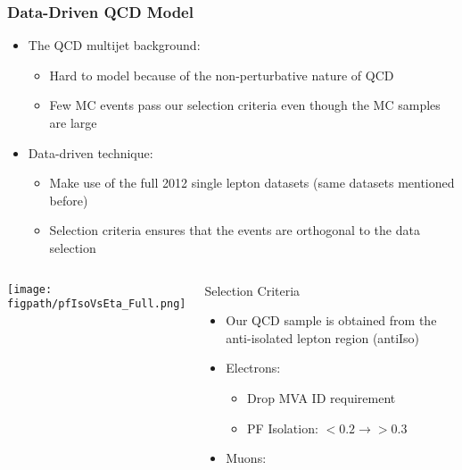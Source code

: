 \begin{frame}
	\frametitle{Data-Driven QCD Model}
	\vspace*{-0.24cm}
	\begin{block}{}
		\begin{itemize}
			\small
			\item The QCD multijet background:
			\begin{itemize}
				\footnotesize
				\item Hard to model because of the non-perturbative nature of QCD
				\item Few MC events pass our selection criteria even though the MC samples are large
			\end{itemize}
			\item Data-driven technique:
			\begin{itemize}
				\footnotesize
				\item Make use of the full 2012 single lepton datasets (same datasets mentioned before)
				\item Selection criteria ensures that the events are orthogonal to the data selection
			\end{itemize}
		\end{itemize}
	\end{block}
	\vspace*{-0.49cm}
	\begin{columns}[T]
			\vspace*{-0.1cm}
			\begin{center}
				\texttt{[image: \\figpath/pfIsoVsEta\_Full.png]}
			\end{center}
			\begin{block}{Selection Criteria}
				\begin{itemize}
					\scriptsize
					\item Our QCD sample is obtained from the anti-isolated lepton region (antiIso)
					\vspace*{-0.15cm}
					\item Electrons:
					\begin{itemize}
						\scriptsize
						\item Drop MVA ID requirement
						\item PF Isolation: $<0.2{\rightarrow}>0.3$
					\end{itemize}
					\vspace*{-0.25cm}
					\item Muons:

\end{itemize}
\end{block}
\end{columns}
\end{frame}
